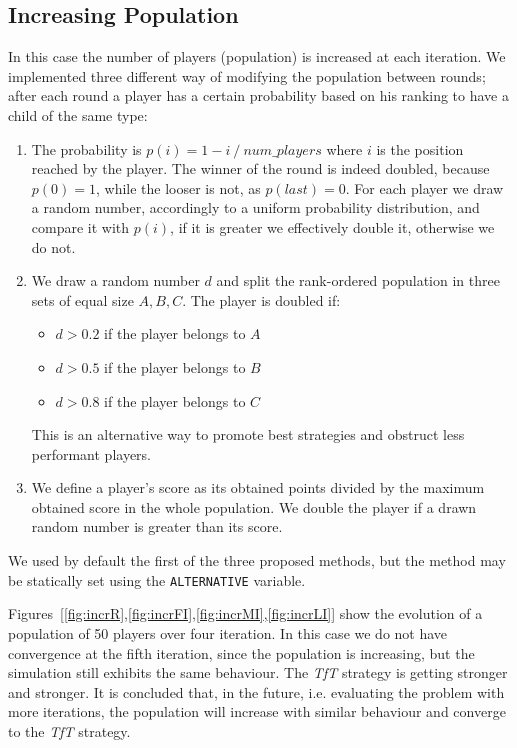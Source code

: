\documentclass[journal,a4paper,10pt,twoside]{IEEEtran} %
\begin{document}
\subsection{Increasing Population}
In this case the number of players (population) is increased at each iteration. We implemented three different way of modifying the population between rounds; after each round a player has a certain probability based on his ranking to have a child of the same type:
\begin{enumerate}
    \item The probability is $p(i)=1- i\ /\ num\_players$ where $i$ is the position reached by the player. The winner of the round is indeed doubled, because $p(0)=1$, while the looser is not, as $p(last)=0$.
    For each player we draw a random number, accordingly to a uniform probability distribution, and compare it with $p(i)$, if it is greater we effectively double it, otherwise we do not.
    \item We draw a random number $d$ and split the rank-ordered population in three sets of equal size $A,B,C$. The player is doubled if:
    \begin{itemize}
        \item $d>0.2$ if the player belongs to $A$
        \item $d>0.5$ if the player belongs to $B$
        \item $d>0.8$ if the player belongs to $C$
    \end{itemize}
    This is an alternative way to promote best strategies and obstruct less performant players.
    \item We define a player's score as its obtained points divided by the maximum obtained score in the whole population. We double the player if a drawn random number is greater than its score.
\end{enumerate}

We used by default the first of the three proposed methods, but the method may be statically set using the \texttt{ALTERNATIVE} variable.

Figures~[\ref{fig:incrR},\ref{fig:incrFI},\ref{fig:incrMI},\ref{fig:incrLI}] show the evolution of a population of 50 players over four iteration. In this case we do not have convergence at the fifth iteration, since the population is increasing, but the simulation still exhibits the same behaviour. The \textit{TfT} strategy is getting stronger and stronger. It is concluded that, in the future, i.e. evaluating the problem with more iterations, the population will increase with similar behaviour and converge to the \textit{TfT} strategy.
\end{document}
